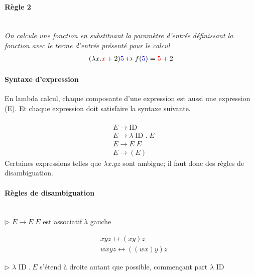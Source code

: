 \documentclass{report}
\begin{document}
\begin{multicols*}{3}
    \paragraph{Règle 2}
    \mbox{}\\
    \textit{On calcule une fonction en substituant la paramètre d'entrée 
    définissant la fonction avec le terme d'entrée présenté pour le calcul}
    \begin{align*}
         (\lambda x.\textcolor{red}{x}  +2)\textcolor{blue}{5}   
          \leftrightarrow f(\textcolor{blue}{5}  ) = \textcolor{red}{5} + 2  
    \end{align*}

    \paragraph{Syntaxe d'expression}
    En lambda calcul, chaque composante d'une expression est 
    aussi une expression (E). Et chaque expression doit satisfaire 
    la syntaxe suivante. 
    \mbox{} \\\\
    \begin{align*}
      & E \rightarrow \text{ID} \\
      & E \rightarrow \lambda \; \text{ID } . \; E \\ 
      & E \rightarrow E \; E \\
      & E \rightarrow (E) 
    \end{align*}
    Certaines expressions telles que $\lambda x. y z$ sont ambigue; 
    il faut donc des règles de disambiguation. 

    \paragraph{Règles de disambiguation} \mbox{}\\ 
    $\rhd$ $E \rightarrow E \; E$ est associatif à gauche

    \begin{align*}
        & x y z \leftrightarrow (x y)z \\ 
        & w x y z \leftrightarrow ((w x) y) z
    \end{align*}

    \noindent
    $\rhd$ $\lambda \text{ ID} \; . \; E$ s'étend à droite autant 
    que possible, commençant part $\lambda \text{ ID}$


\end{multicols*}
\end{document}
